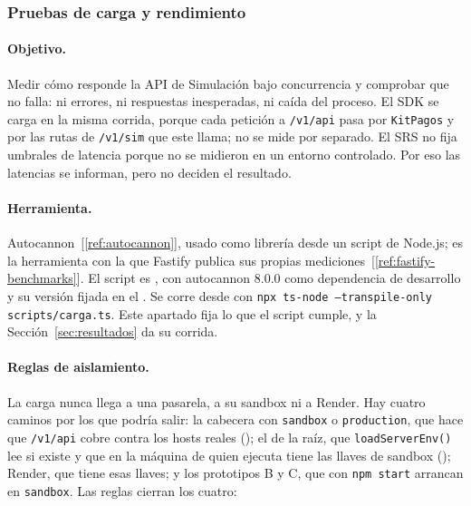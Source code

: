 \subsubsection{Pruebas de carga y rendimiento}
\label{sec:carga}

\paragraph{Objetivo.} Medir cómo responde la API de Simulación bajo concurrencia y comprobar que no falla: ni errores, ni respuestas inesperadas, ni caída del proceso. El SDK se carga en la misma corrida, porque cada petición a \texttt{/v1/api} pasa por \texttt{KitPagos} y por las rutas de \texttt{/v1/sim} que este llama; no se mide por separado. El SRS no fija umbrales de latencia porque no se midieron en un entorno controlado. Por eso las latencias se informan, pero no deciden el resultado.

\paragraph{Herramienta.} Autocannon~[\ref{ref:autocannon}], usado como librería desde un script de Node.js; es la herramienta con la que Fastify publica sus propias mediciones~[\ref{ref:fastify-benchmarks}]. El script es , con autocannon 8.0.0 como dependencia de desarrollo y su versión fijada en el . Se corre desde  con \texttt{npx ts-node --transpile-only scripts/carga.ts}. Este apartado fija lo que el script cumple, y la Sección~\ref{sec:resultados} da su corrida.

\paragraph{Reglas de aislamiento.} La carga nunca llega a una pasarela, a su sandbox ni a Render. Hay cuatro caminos por los que podría salir: la cabecera  con \texttt{sandbox} o \texttt{production}, que hace que \texttt{/v1/api} cobre contra los hosts reales (); el  de la raíz, que \texttt{loadServerEnv()} lee si existe y que en la máquina de quien ejecuta tiene las llaves de sandbox (); Render, que tiene esas llaves; y los prototipos B y C, que con \texttt{npm start} arrancan en \texttt{sandbox}. Las reglas cierran los cuatro:

